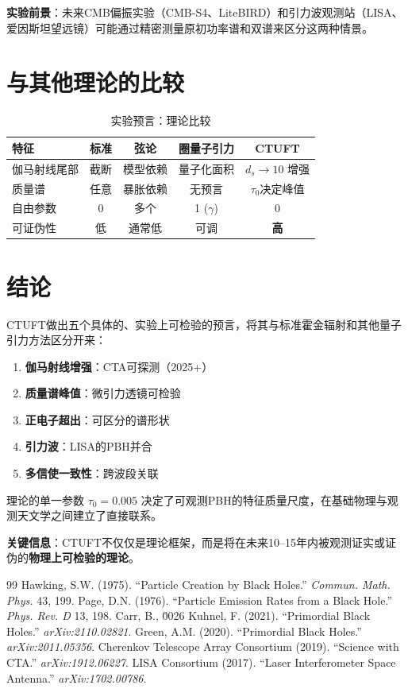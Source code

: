 \textbf{实验前景}：未来CMB偏振实验（CMB-S4、LiteBIRD）和引力波观测站（LISA、爱因斯坦望远镜）可能通过精密测量原初功率谱和双谱来区分这两种情景。

\section{与其他理论的比较}
\label{sec:comparison-theories}

\begin{table}[htbp]
\centering
\caption{实验预言：理论比较}
\label{tab:theory-comparison}
\begin{tabular}{@{}lcccc@{}}
\toprule
\textbf{特征} & \textbf{标准} & \textbf{弦论} & \textbf{圈量子引力} & \textbf{CTUFT} \\
\midrule
伽马射线尾部 & 截断 & 模型依赖 & 量子化面积 & $d_s \to 10$ 增强 \\
质量谱 & 任意 & 暴胀依赖 & 无预言 & $\tau_0$决定峰值 \\
自由参数 & 0 & 多个 & 1 ($\gamma$) & 0 \\
可证伪性 & 低 & 通常低 & 可调 & \textbf{高} \\
\bottomrule
\end{tabular}
\end{table}

\section{结论}
\label{sec:exp-conclusion}

CTUFT做出五个具体的、实验上可检验的预言，将其与标准霍金辐射和其他量子引力方法区分开来：

\begin{enumerate}
    \item \textbf{伽马射线增强}：CTA可探测（2025+）
    \item \textbf{质量谱峰值}：微引力透镜可检验
    \item \textbf{正电子超出}：可区分的谱形状
    \item \textbf{引力波}：LISA的PBH并合
    \item \textbf{多信使一致性}：跨波段关联
\end{enumerate}

理论的单一参数 $\tau_0 = 0.005$ 决定了可观测PBH的特征质量尺度，在基础物理与观测天文学之间建立了直接联系。

\textbf{关键信息}：CTUFT不仅仅是理论框架，而是将在未来10--15年内被观测证实或证伪的\textbf{物理上可检验的理论}。

\begin{thebibliography}{99}
 Hawking, S.W. (1975). ``Particle Creation by Black Holes.'' \textit{Commun. Math. Phys.} 43, 199.
 Page, D.N. (1976). ``Particle Emission Rates from a Black Hole.'' \textit{Phys. Rev. D} 13, 198.
 Carr, B., \u0026 Kuhnel, F. (2021). ``Primordial Black Holes.'' \textit{arXiv:2110.02821}.
 Green, A.M. (2020). ``Primordial Black Holes.'' \textit{arXiv:2011.05356}.
 Cherenkov Telescope Array Consortium (2019). ``Science with CTA.'' \textit{arXiv:1912.06227}.
 LISA Consortium (2017). ``Laser Interferometer Space Antenna.'' \textit{arXiv:1702.00786}.
\end{thebibliography}
